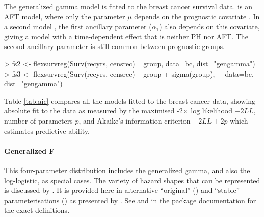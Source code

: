 \documentclass[nojss,nofooter]{jss}
\begin{document}
The generalized gamma model is fitted to the breast cancer survival
data.  is an AFT model, where only the parameter
$\mu$ depends on the prognostic covariate .  In a second
model , the first ancillary parameter  ($\alpha_1$) also
depends on this covariate, giving a model with a time-dependent effect
that is neither PH nor AFT.  The second ancillary parameter 
is still common between prognostic groups.
\begin{Schunk}
\begin{Sinput}
> fs2 <- flexsurvreg(Surv(recyrs, censrec) ~ group, data=bc, dist="gengamma")
> fs3 <- flexsurvreg(Surv(recyrs, censrec) ~ group + sigma(group), 
+                    data=bc, dist="gengamma")
\end{Sinput}
\end{Schunk}
Table \ref{tab:aic} compares all the models fitted to the breast
cancer data, showing absolute fit to the data as measured by the
maximised -2$\times$ log likelihood $-2LL$, number of parameters $p$,
and Akaike's information criterion $-2LL + 2p$ which estimates
predictive ability.


\paragraph{Generalized F} This four-parameter distribution includes
the generalized gamma, and also the log-logistic, as special cases.
The variety of hazard shapes that can be represented is discussed by
\citet{ccox:genf}.  It is provided here in alternative ``original''
() and ``stable'' parameterisations
() as presented by \citet{prentice:genf}. 
See  and  in the package documentation 
for the exact definitions.
\end{document}
